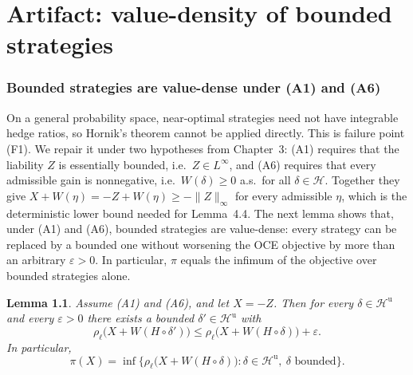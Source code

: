 \documentclass[11pt,a4paper]{report}
\numberwithin{equation}{chapter}
\theoremstyle{plain}
\newtheorem{lemma}[proposition]{Lemma}
\theoremstyle{definition}
\newcommand{\HH}{\mathcal{H}}
\newcommand{\Hu}{\mathcal{H}^{\mathrm{u}}}
\begin{document}
\setcounter{chapter}{3}

\chapter{Artifact: value-density of bounded strategies}

\subsection*{Bounded strategies are value-dense under (A1) and (A6)}

On a general probability space, near-optimal strategies need not have
integrable hedge ratios, so Hornik's theorem cannot be applied
directly. This is failure point (F1). We repair it under two hypotheses
from Chapter~3: (A1) requires that the liability $Z$ is essentially
bounded, i.e.\ $Z\in L^\infty$, and (A6) requires that every admissible
gain is nonnegative, i.e.\ $W(\delta)\ge0$ a.s.\ for all $\delta\in\HH$.
Together they give $X+W(\eta)=-Z+W(\eta)\ge-\|Z\|_\infty$ for every
admissible $\eta$, which is the deterministic lower bound needed for
Lemma~4.4. The next lemma shows that, under (A1) and (A6), bounded
strategies are value-dense: every strategy can be replaced by a bounded
one without worsening the OCE objective by more than an arbitrary
$\varepsilon>0$. In particular, $\pi$ equals the infimum of the
objective over bounded strategies alone.

\begin{lemma}\label{lem:truncation}
  Assume (A1) and (A6), and let $X=-Z$. Then for every $\delta\in\Hu$ and
  every $\varepsilon>0$ there exists a bounded $\delta'\in\Hu$ with
  \[
    \rho_\ell\bigl(X+W(H\circ\delta')\bigr)
    \le\rho_\ell\bigl(X+W(H\circ\delta)\bigr)+\varepsilon.
  \]
  In particular,
  \[
    \pi(X)=\inf\bigl\{\rho_\ell\bigl(X+W(H\circ\delta)\bigr):
    \delta\in\Hu,\ \delta\text{ bounded}\bigr\}.
  \]
\end{lemma}
\end{document}
